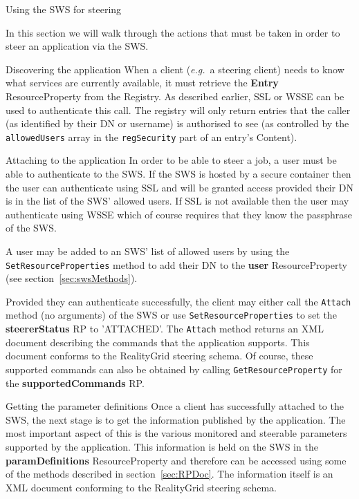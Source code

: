 \documentclass[a4paper]{article}
\begin{document}
\begin{section}{Using the SWS for steering}
\label{sec:sws_steering}

In this section we will walk through the actions that must be taken in
order to steer an application via the SWS.

\begin{subsection}{Discovering the application}
When a client ({\it e.g.}\ a steering client) needs to know what
services are currently available, it must retrieve the {\bf Entry}
ResourceProperty from the Registry.  As described earlier, SSL or WSSE
can be used to authenticate this call.  The registry will only return
entries that the caller (as identified by their DN or username) is
authorised to see (as controlled by the \texttt{allowedUsers} array in
the \texttt{regSecurity} part of an entry's Content).
\end{subsection}

\begin{subsection}{Attaching to the application}
In order to be able to steer a job, a user must be able to
authenticate to the SWS.  If the SWS is hosted by a secure container
then the user can authenticate using SSL and will be granted access
provided their DN is in the list of the SWS' allowed users.  If SSL is
not available then the user may authenticate using WSSE which of
course requires that they know the passphrase of the SWS.

A user may be added to an SWS' list of allowed users by using the 
\texttt{SetResourceProperties} method to add their DN to the {\bf user}
ResourceProperty (see section~\ref{sec:swsMethods}).

Provided they can authenticate successfully, the client may either
call the \texttt{Attach} method (no arguments) of the SWS or use
\texttt{SetResourceProperties} to set the {\bf steererStatus} RP to
'ATTACHED'.  The \texttt{Attach} method returns an XML document describing the
commands that the application supports.  This document conforms to the
RealityGrid steering schema. Of course, these supported commands can
also be obtained by calling \texttt{GetResourceProperty} for the
{\bf supportedCommands} RP.

\end{subsection}

\begin{subsection}{Getting the parameter definitions}
Once a client has successfully attached to the SWS, the next stage is
to get the information published by the application.  The most
important aspect of this is the various monitored and steerable
parameters supported by the application.  This information is held on
the SWS in the {\bf paramDefinitions} ResourceProperty and therefore
can be accessed using some of the methods described in
section~\ref{sec:RPDoc}.  The information itself is an XML document
conforming to the RealityGrid steering schema.
\end{subsection}


\end{section}
\end{document}
